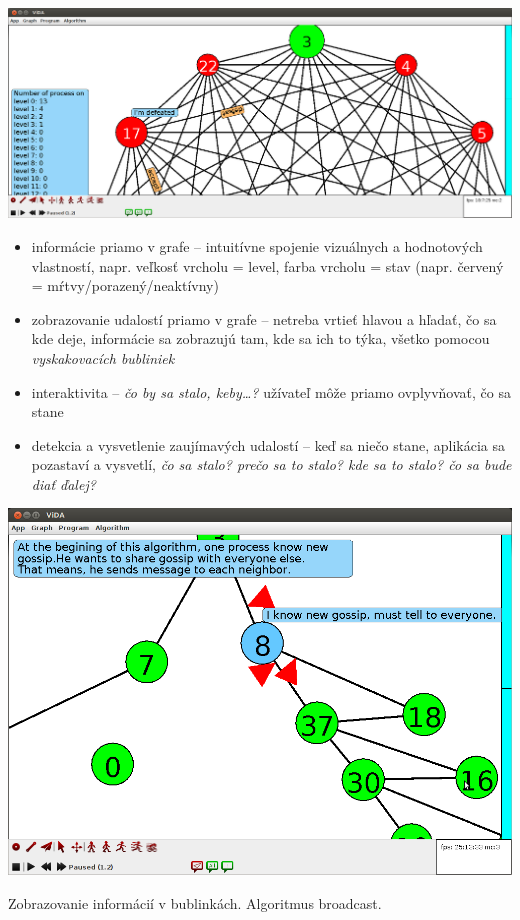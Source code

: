 \includegraphics[width=\columnwidth]{le}


\begin{itemize}

    \item informácie priamo v grafe -- intuitívne spojenie vizuálnych a hodnotových
    vlastností, napr. veľkosť vrcholu = level, farba vrcholu = stav (napr. červený =
    mŕtvy/porazený/neaktívny)
    \item zobrazovanie udalostí priamo v grafe -- netreba vrtieť hlavou a hľadať, čo sa kde deje,
    informácie sa zobrazujú tam, kde sa ich to týka, všetko pomocou \emph{vyskakovacích bubliniek}
    \item interaktivita -- \emph{čo by sa stalo, keby\dots?} užívateľ môže priamo ovplyvňovať, čo sa
    stane
    \item detekcia a vysvetlenie zaujímavých udalostí -- keď sa niečo stane, aplikácia sa pozastaví
    a vysvetlí, 
    \emph{čo sa stalo? prečo sa to stalo? kde sa to stalo? čo sa bude diať ďalej?}

\end{itemize}


\includegraphics[width=\columnwidth]{bfs}
\caption{Zobrazovanie informácií v bublinkách. Algoritmus broadcast.}

